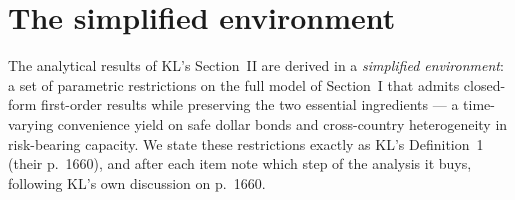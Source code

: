 \section{The simplified environment}
\label{sec:environment}

The analytical results of KL's Section~II are derived in a \emph{simplified
environment}: a set of parametric restrictions on the full model of Section~I
that admits closed-form first-order results while preserving the two essential
ingredients --- a time-varying convenience yield on safe dollar bonds and
cross-country heterogeneity in risk-bearing capacity. We state these
restrictions exactly as KL's Definition~1 (their p.~1660), and after each item
note which step of the analysis it buys, following KL's own discussion on
p.~1660.

